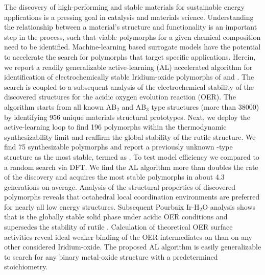 %


%
\noindent The discovery of high-performing and stable materials for sustainable energy applications is a pressing goal in catalysis and materials science.
%
Understanding the relationship between a material's structure and functionality is an important step in the process, such that viable polymorphs for a given chemical composition need to be identified.
%
Machine-learning based surrogate models have the potential to accelerate the search for polymorphs that target specific applications.
%
Herein, we report a readily generalizable active-learning (AL) accelerated algorithm for identification of electrochemically stable Iridium-oxide polymorphs of \IrOtwo and \IrOthree.
%
The search is coupled to a subsequent analysis of the electrochemical stability of the discovered structures for the acidic oxygen evolution reaction (OER).
%
The algorithm starts from all known AB$_2$ and AB$_3$ type structures (more than \num{38000}) by identifying 956 unique materials structural prototypes.
%
Next, we deploy the active-learning loop to  find \num{196} \IrOtwo polymorphs within the thermodynamic synthesizability limit and reaffirm the global stability of the rutile structure.
%
We find \num{75} synthesizable \IrOthree polymorphs and report a previously unknown -type structure as the most stable, termed as \aIrOthree. To test model efficiency we compared to a random search via DFT.
%
We find the AL algorithm more than doubles the rate of the discovery and acquires the most stable polymorphs in about \num{4.3} generations on average.
%
Analysis of the structural properties of discovered polymorphs reveals that octahedral local coordination environments are preferred for nearly all low energy structures.
%
Subsequent Pourbaix Ir-H$_2$O analysis shows that \aIrOthree is the globally stable solid phase under acidic OER conditions and supersedes the stability of rutile \IrOtwo.
%
Calculation of theoretical OER surface activities reveal ideal
weaker binding of the OER intermediates on \aIrOthree than on any other considered Iridium-oxide.
%
The proposed AL algorithm  is easily generalizable to search for any binary metal-oxide structure with a predetermined stoichiometry.





